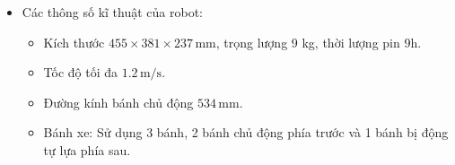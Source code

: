 \begin{itemize}
\begin{figure}[H]
            \end{figure}
            \item Các thông số kĩ thuật của robot:
                \begin{itemize}[label=\textendash]
                    \item Kích thước $455 \times 381 \times 237 \,\mathrm{mm}$, trọng lượng 9 kg, thời lượng pin 9h.
                    \item Tốc độ tối đa $1.2 \,\mathrm{m/s}$.
                    \item Đường kính bánh chủ động $534 \,\mathrm{mm}$.
                    \item Bánh xe: Sử dụng 3 bánh, 2 bánh chủ động phía trước và 1 bánh bị động tự lựa phía sau.
                \end{itemize}
        \end{itemize}



